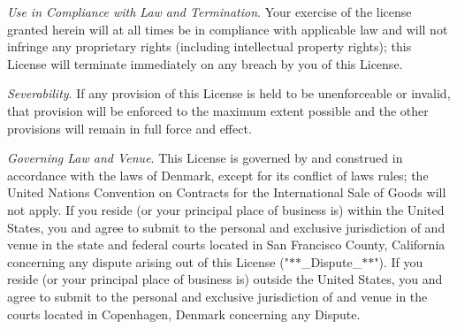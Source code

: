 \begin{DoxyEnumerate}
\item {\itshape Use in Compliance with Law and Termination}. Your exercise of the license granted herein will at all times be in compliance with applicable law and will not infringe any proprietary rights (including intellectual property rights); this License will terminate immediately on any breach by you of this License.
\end{DoxyEnumerate}
\begin{DoxyEnumerate}
\item {\itshape Severability}. If any provision of this License is held to be unenforceable or invalid, that provision will be enforced to the maximum extent possible and the other provisions will remain in full force and effect.
\end{DoxyEnumerate}
\begin{DoxyEnumerate}
\item {\itshape Governing Law and Venue}. This License is governed by and construed in accordance with the laws of Denmark, except for its conflict of laws rules; the United Nations Convention on Contracts for the International Sale of Goods will not apply. If you reside (or your principal place of business is) within the United States, you and  agree to submit to the personal and exclusive jurisdiction of and venue in the state and federal courts located in San Francisco County, California concerning any dispute arising out of this License ("{}\texorpdfstring{$\ast$}{*}\texorpdfstring{$\ast$}{*}\+\_\+\+Dispute\+\_\+\texorpdfstring{$\ast$}{*}\texorpdfstring{$\ast$}{*}"{}). If you reside (or your principal place of business is) outside the United States, you and  agree to submit to the personal and exclusive jurisdiction of and venue in the courts located in Copenhagen, Denmark concerning any Dispute. 
\end{DoxyEnumerate}